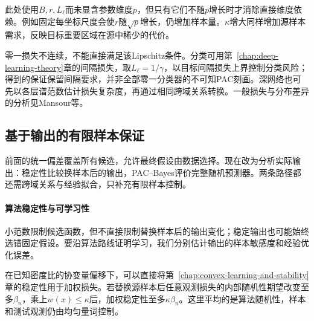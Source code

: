 此处使用$B,r,L_{\ell}$而未显含参数维度$p$，但只有它们不随$p$增长时才消除直接维度依赖。例如固定每坐标尺度会使$r$随$\sqrt p$增长，仍增加样本量。$\kappa$增大同样增加源样本需求，反映目标重要区域在源中稀少的代价。

零一损失不连续，不能直接满足该Lipschitz条件。分类可用第~\ref{chap:deep-learning-theory}章的间隔损失，取$L_{\ell}=1/\gamma$，以目标间隔损失上界控制分类风险；得到的保证保留间隔要求，并非全部零一分类器的不可知PAC刻画。深网络也可先以各层谱范数估计损失复杂度，再通过相同跨域关系转换。一般损失与分布差异的分析见Mansour等。

\subsection{基于输出的有限样本保证}
\label{sec:transfer-stability}
\label{sec:adaptation-output-bounds}

前面的统一偏差覆盖所有候选，允许最终假设由数据选择。现在改为分析实际输出：稳定性比较换样本后的输出，PAC--Bayes评价完整随机预测器。两条路径都还需跨域关系与经验拟合，只补充有限样本控制。

\paragraph{算法稳定性与可学习性}

小范数限制候选函数，但不直接限制替换样本后的输出变化；稳定输出也可能始终选错固定假设。要沿算法路线证明学习，我们分别估计输出的样本敏感度和经验优化误差。

在已知密度比的协变量偏移下，可以直接将第~\ref{chap:convex-learning-and-stability}章的稳定性用于加权损失。若替换源样本后任意观测损失的内部随机性期望改变至多$\beta_n$，乘上$w(x)\leq\kappa$后，加权稳定性至多$\kappa\beta_n$。这里平均的是算法随机性，样本和测试观测仍由均匀量词控制。

